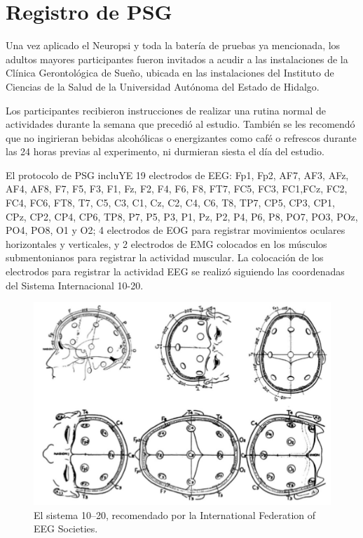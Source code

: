 
\section{Registro de PSG}

Una vez aplicado el Neuropsi y toda la bater\'ia de pruebas ya mencionada, los adultos mayores
participantes fueron invitados a acudir a las instalaciones de la Cl\'inica Gerontol\'ogica de 
Sue\~no, ubicada en las instalaciones del Instituto de Ciencias de la Salud de la Universidad 
Aut\'onoma del Estado de Hidalgo.


Los participantes recibieron instrucciones de realizar una rutina normal de actividades durante la 
semana que precedi\'o al estudio. Tambi\'en se les recomend\'o que no ingirieran bebidas 
alcoh\'olicas o energizantes como caf\'e o refrescos durante las 24 horas previas al experimento, 
ni durmieran siesta el d\'ia del estudio. 



El protocolo de PSG incluYE 19 electrodos de EEG: 
Fp1, Fp2, AF7, AF3, AFz, AF4, AF8, F7, F5, F3, F1, Fz, F2, F4, F6, F8, FT7, 
FC5, FC3, FC1,FCz, FC2, FC4, FC6, FT8, T7, C5, C3, C1, Cz, C2, C4, C6, T8, TP7, CP5, CP3, CP1,
CPz, CP2, CP4, CP6, TP8, P7, P5, P3, P1, Pz, P2, P4, P6, P8, PO7, PO3, POz, PO4, PO8, O1 y O2; 
4 electrodos de EOG para registrar movimientos oculares horizontales y verticales, 
y 2 electrodos de EMG colocados en los m\'usculos submentonianos para registrar la actividad 
muscular. 
La colocaci\'on de los electrodos para registrar la actividad EEG se realiz\'o siguiendo las 
coordenadas del Sistema Internacional 10-20\cite{Coleman87}.

\begin{figure}
\centering
\includegraphics[width=\linewidth]{figura_6.png} 
\caption{El sistema 10--20, recomendado por la
International Federation of EEG Societies. 
}
\end{figure}


